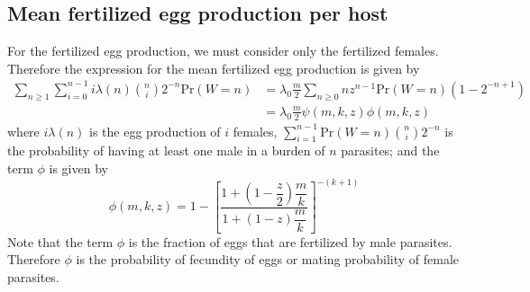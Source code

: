\documentclass[12pt,a4paper]{article}
\theoremstyle{plain}%
\theoremstyle{definition}
\theoremstyle{remark}
\begin{document}
\subsection{Mean fertilized egg production per host}\label{sec:fertilized-egg-production}
For the fertilized egg production, we must consider only the fertilized females. Therefore the expression for the mean fertilized egg production is given by
\begin{equation}\label{eggfecun}
\begin{split}
\sum_{n\geq 1}\sum_{i=0}^{n-1}	i\lambda(n)	\binom{n}{i}2^{-n} \mathrm{Pr}(W=n)
&=\lambda_0\frac{m}{2}\sum_{n\geq 0}nz^{n-1} \mathrm{Pr}(W=n) (1-2^{-n+1})\\
&=\lambda_0\frac{m}{2} \psi(m,k,z) \phi(m,k,z)
\end{split}
\end{equation}
where
	$i\lambda(n)$ is the egg production of $i$ females, $\sum_{i=1}^{n-1} \mathrm{Pr}(W=n) \binom{n}{i}2^{-n}$ is the probability 
	of having at least one male in a burden of $n$ parasites;  and the term $\phi$ is given by
 \begin{equation}
 \phi(m,k,z)=1-\left[ \frac{1+ \left( 1-\dfrac{z}{2} \right) \dfrac{m}{k}}{1+(1-z)\dfrac{m}{k}}\right] ^{-(k+1)}
 \end{equation}
 Note that the term $\phi$ is the fraction of eggs that are fertilized by male parasites. Therefore $\phi$ is the probability of fecundity of eggs or mating probability of female parasites.
 
\end{document}
